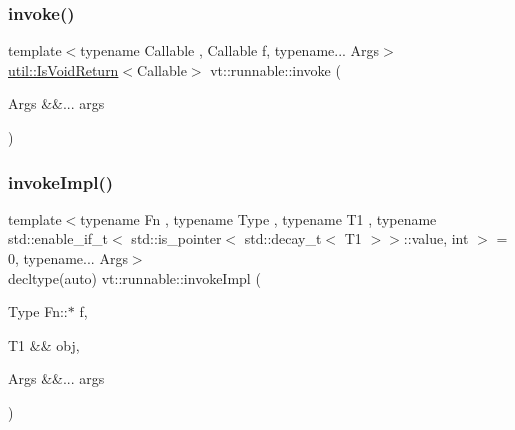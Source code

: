 \mbox{\label{namespacevt_1_1runnable_ad7a4c11af0d8864939dca87f89fba1cb}} 
\subsubsection{\texorpdfstring{invoke()}{invoke()}\hspace{0.1cm}{\footnotesize\ttfamily [3/3]}}
{\footnotesize\ttfamily template$<$typename Callable , Callable f, typename... Args$>$ \\
\hyperlink{namespacevt_1_1util_a97df3e28837417537b3bc035c74f064d}{util\+::\+Is\+Void\+Return}$<$Callable$>$ vt\+::runnable\+::invoke (\begin{DoxyParamCaption}\item[{Args \&\&...}]{args }\end{DoxyParamCaption})}

\mbox{\label{namespacevt_1_1runnable_a4253e4fa9c8c6e68da420ab440f2b298}} 
\subsubsection{\texorpdfstring{invoke\+Impl()}{invokeImpl()}\hspace{0.1cm}{\footnotesize\ttfamily [1/2]}}
{\footnotesize\ttfamily template$<$typename Fn , typename Type , typename T1 , typename std\+::enable\+\_\+if\+\_\+t$<$ std\+::is\+\_\+pointer$<$ std\+::decay\+\_\+t$<$ T1 $>$$>$\+::value, int $>$  = 0, typename... Args$>$ \\
decltype(auto) vt\+::runnable\+::invoke\+Impl (\begin{DoxyParamCaption}\item[{Type Fn\+::$\ast$}]{f,  }\item[{T1 \&\&}]{obj,  }\item[{Args \&\&...}]{args }\end{DoxyParamCaption})}

\mbox{\label{namespacevt_1_1runnable_af14b1c72fc3bf8437c2b89021af7eecf}} 
